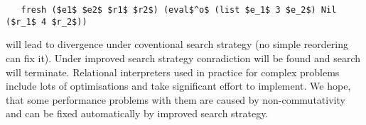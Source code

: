 \begin{lstlisting}
   fresh ($e1$ $e2$ $r1$ $r2$) (eval$^o$ (list $e_1$ 3 $e_2$) Nil ($r_1$ 4 $r_2$))
\end{lstlisting}

\noindent will lead to divergence under coventional search strategy (no simple reordering can fix it). Under improved search strategy conradiction will be found and search will terminate. Relational interpreters used in practice for complex problems~\cite{unified} include lots of optimisations and take significant effort to implement. We hope, that some performance problems with them are caused by non-commutativity and can be fixed automatically by improved search strategy.
